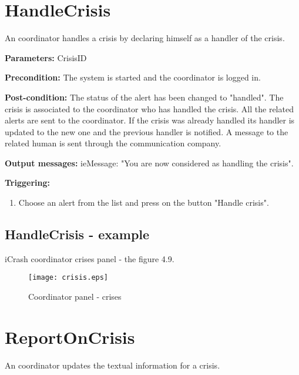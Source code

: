 \section{HandleCrisis}
\label{operation:HandleCrisis}

An coordinator handles a crisis by declaring himself as a handler of the crisis.

\begin{description}
	\item \textbf{Parameters:} CrisisID 
	\item \textbf{Precondition:} The system is started and the coordinator is
	logged in.
	\item \textbf{Post-condition:} The status of the alert has been changed to
	"handled". The crisis is associated to the coordinator who has handled the crisis.
	All the related alerts are sent to the coordinator. If the crisis was already
	handled its handler is updated to the new one and the previous handler is
	notified. A message to the related human is sent through the communication
	company.
	\item \textbf{Output messages:} ieMessage: "You are now considered as handling
	the crisis".
	
	\item \textbf{Triggering:}
	
	\begin{enumerate}
		\item Choose an alert from the list and press on the button "Handle crisis".
	\end{enumerate}
\end{description}

\subsection{HandleCrisis - example}
iCrash coordinator crises panel - the figure 4.9.
\begin{figure}
    \texttt{[image: crisis.eps]}
	\caption{Coordinator panel - crises}
\end{figure}

\section{ReportOnCrisis}
\label{operation:ReportOnCrisis}

An coordinator updates the textual information for a crisis.

